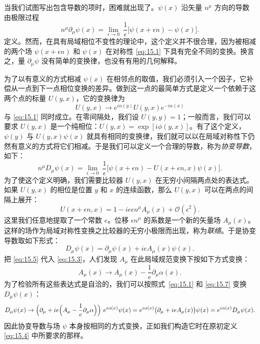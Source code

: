 当我们试图写出包含导数的项时，困难就出现了。$\psi(x)$ 沿矢量 $n^\mu$ 方向的导数由极限过程
\begin{equation}
  n^\mu\partial_\mu\psi(x) = \lim_{\epsilon\to 0}\ \frac{1}{\epsilon}\bigl[
    \psi(x+\epsilon n) - \psi(x) \bigr] .
  \label{eq:15.2}
\end{equation}
定义。然而，在具有局域相位不变性的理论中，这个定义并不很合理，因为被相减的两个场 $\psi(x+\epsilon n)$ 和 $\psi(x)$ 在对称性 \eqref{eq:15.1} 下具有完全不同的变换。换言之，量 $\partial_\mu\psi$ 没有简单的变换律，也没有有用的几何解释。

为了以有意义的方式相减 $\psi(x)$ 在相邻点的取值，我们必须引入一个因子，它补偿从一点到下一点相位变换的差异。做到这一点的最简单方式是定义一个依赖于这两个点的标量 $U(y,x)$，它的变换律为
\begin{equation}
  U(y,x) \to e^{i\alpha(y)}U(y,x)e^{-i\alpha(x)}
  \label{eq:15.3}
\end{equation}
与 \eqref{eq:15.1} 同时成立。在零间隔处，我们设 $U(y,y) = 1$；一般而言，我们可以要求 $U(y,x)$ 是一个纯相位：$U(y,x) = \exp[i\phi(y,x)]$。有了这个定义，$\psi(y)$ 与 $U(y,x)\psi(x)$ 就具有相同的变换律，我们就可以以在局域对称性下仍然有意义的方式将它们相减。于是我们可以定义一个合理的导数，称为\emph{协变导数}，如下：
\begin{equation}
  n^\mu D_\mu\psi(x) = \lim_{\epsilon\to 0}\ \frac{1}{\epsilon}\bigl[
    \psi(x+\epsilon n) - U(x+\epsilon n, x)\psi(x) \bigr] .
  \label{eq:15.4}
\end{equation}
为了使这个定义明确，我们需要比较器 $U(y,x)$ 在无穷小间隔两点处的表达式。如果 $U(y,x)$ 的相位是位置 $y$ 和 $x$ 的连续函数，那么 $U(y,x)$ 可以在两点的间隔上展开：
\begin{equation}
  U(x+\epsilon n, x) = 1 - ie\epsilon n^\mu A_\mu(x) + \mathcal{O}(\epsilon^2) .
  \label{eq:15.5}
\end{equation}
这里我们任意地提取了一个常数 $e$。位移 $\epsilon n^\mu$ 的系数是一个新的矢量场 $A_\mu(x)$。这样的场作为局域对称性变换之比较器的无穷小极限而出现，称为\emph{联络}。于是协变导数取如下形式：
\begin{equation}
  D_\mu\psi(x) = \partial_\mu\psi(x) + ieA_\mu(x)\psi(x) .
  \label{eq:15.6}
\end{equation}
把 \eqref{eq:15.5} 代入 \eqref{eq:15.3}，人们发现 $A_\mu$ 在此局域规范变换下按如下方式变换：
\begin{equation}
  A_\mu(x) \to A_\mu(x) - \frac{1}{e}\partial_\mu\alpha(x) .
  \label{eq:15.7}
\end{equation}
为了检验所有这些表达式是自洽的，我们可以按照式~\eqref{eq:15.1} 和 \eqref{eq:15.7} 变换 $D_\mu\psi(x)$：
\begin{equation}
  D_\mu\psi(x) \to \Bigl( \partial_\mu + ie\Bigl( A_\mu - \frac{1}{e}
    \partial_\mu\alpha \Bigr) \Bigr)\ e^{i\alpha(x)}\psi(x)
  = e^{i\alpha(x)}\bigl( \partial_\mu + ieA_\mu(x) \bigr)\psi(x)
  = e^{i\alpha(x)}D_\mu\psi(x) .
  \label{eq:15.8}
\end{equation}
因此协变导数与场 $\psi$ 本身按相同的方式变换，正如我们构造它时在原初定义 \eqref{eq:15.4} 中所要求的那样。

